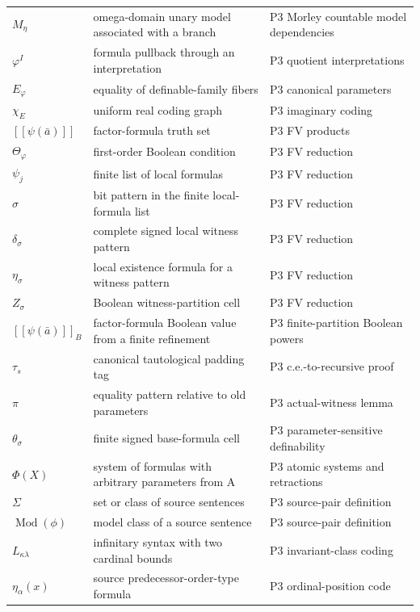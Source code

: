 \begin{longtable}{@{}p{}p{}p{}@{}}
\(M_\eta\) & omega-domain unary model associated with a branch & P3 Morley countable model dependencies \\
\(\varphi^I\) & formula pullback through an interpretation & P3 quotient interpretations \\
\(E_\varphi\) & equality of definable-family fibers & P3 canonical parameters \\
\(\chi_E\) & uniform real coding graph & P3 imaginary coding \\
\([\![\psi(\bar a)]\!]\) & factor-formula truth set & P3 FV products \\
\(\Theta_\varphi\) & first-order Boolean condition & P3 FV reduction \\
\(\psi_j\) & finite list of local formulas & P3 FV reduction \\
\(\sigma\) & bit pattern in the finite local-formula list & P3 FV reduction \\
\(\delta_\sigma\) & complete signed local witness pattern & P3 FV reduction \\
\(\eta_\sigma\) & local existence formula for a witness pattern & P3 FV reduction \\
\(Z_\sigma\) & Boolean witness-partition cell & P3 FV reduction \\
\([\![\psi(\bar a)]\!]_B\) & factor-formula Boolean value from a finite refinement & P3 finite-\allowbreak{}partition Boolean powers \\
\(\tau_s\) & canonical tautological padding tag & P3 c.\allowbreak{}e.-\allowbreak{}to-\allowbreak{}recursive proof \\
\(\pi\) & equality pattern relative to old parameters & P3 actual-\allowbreak{}witness lemma \\
\(\theta_\sigma\) & finite signed base-formula cell & P3 parameter-\allowbreak{}sensitive definability \\
\(\Phi(X)\) & system of formulas with arbitrary parameters from A & P3 atomic systems and retractions \\
\(\Sigma\) & set or class of source sentences & P3 source-\allowbreak{}pair definition \\
\(\operatorname{Mod}(\phi)\) & model class of a source sentence & P3 source-\allowbreak{}pair definition \\
\(L_{\kappa\lambda}\) & infinitary syntax with two cardinal bounds & P3 invariant-\allowbreak{}class coding \\
\(\eta_\alpha(x)\) & source predecessor-order-type formula & P3 ordinal-\allowbreak{}position code \\

\end{longtable}
